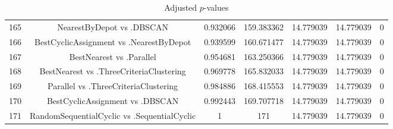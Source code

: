 \documentclass[a4paper,10pt]{article}
\begin{document}
\begin{landscape}
\begin{table}[!htp]
\begin{tabular}{ccccccc}
165&NearestByDepot vs .DBSCAN&0.932066&159.383362&14.779039&14.779039&0\\
166&BestCyclicAssignment vs .NearestByDepot&0.939599&160.671477&14.779039&14.779039&0\\
167&BestNearest vs .Parallel&0.954681&163.250366&14.779039&14.779039&0\\
168&BestNearest vs .ThreeCriteriaClustering&0.969778&165.832033&14.779039&14.779039&0\\
169&Parallel vs .ThreeCriteriaClustering&0.984886&168.415553&14.779039&14.779039&0\\
170&BestCyclicAssignment vs .DBSCAN&0.992443&169.707718&14.779039&14.779039&0\\
171&RandomSequentialCyclic vs .SequentialCyclic&1&171&14.779039&14.779039&0\\
\hline
\end{tabular}
\caption{Adjusted $p$-values}
\end{table}

\end{landscape}
\end{document}
